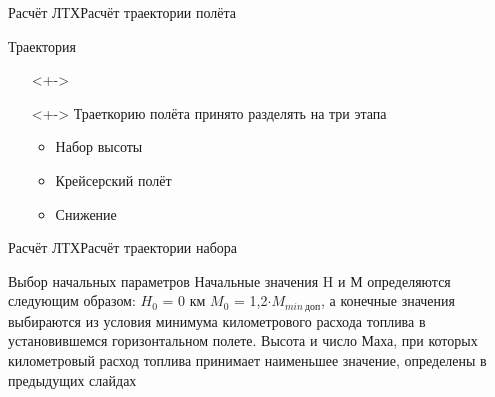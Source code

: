 \begin{frame}{Расчёт ЛТХ}{Расчёт траектории полёта}
    \begin{block}{Траектория}
    \begin{itemize}
        \item [] <+->
        \item [] <+-> Траеткорию полёта принято разделять на три этапа 
            \begin{itemize}
                \item Набор высоты 
                \item Крейсерский полёт 
                \item Снижение 
            \end{itemize}
    \end{itemize}
    \end{block}
\end{frame}

\begin{frame}{Расчёт ЛТХ}{Расчёт траектории набора}
    \begin{block}{Выбор начальных параметров}
        Начальные значения H и М определяются следующим образом: $H_0$ = 0 км $M_0$ = 1,2$\cdot M_{min \ \text{доп}}$, а конечные значения выбираются из
        условия минимума километрового расхода топлива в установившемся горизонтальном полете. Высота и число Маха, при которых километровый расход 
        топлива принимает наименьшее значение, определены в предыдущих слайдах 
    \end{block}
\end{frame}

